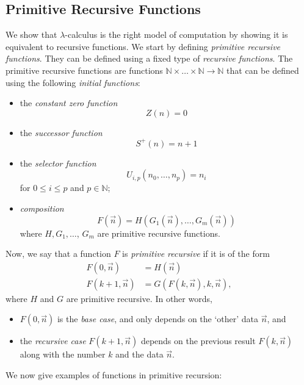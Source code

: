 \documentclass[a4paper, openany]{memoir}
\theoremstyle{definition}
\begin{document}
    \subsection{Primitive Recursive Functions}
    We show that $\lambda$-calculus is the right model of computation by showing it is equivalent to recursive functions. We start by defining \emph{primitive recursive functions}. They can be defined using a fixed type of \emph{recursive functions}. The primitive recursive functions are functions $\mathbb{N} \times \dots \times \mathbb{N} \to \mathbb{N}$ that can be defined using the following \emph{initial functions}:
    \begin{itemize}
        \item the \emph{constant zero function} 
        \[Z(n) = 0\]
        \item the \emph{successor function} 
        \[S^+(n) = n+1\]
        \item the \emph{selector function} 
        \[U_{i, p}(n_0, \dots, n_p) = n_i\]
        for $0 \leq i \leq p$ and $p \in \mathbb{N}$;
        \item \emph{composition} 
        \[F(\vec{n}) = H(G_1(\vec{n}), \dots, G_m(\vec{n}))\]
        where $H, G_1, \dots$, $G_m$ are primitive recursive functions.
    \end{itemize}
    Now, we say that a function $F$ is \emph{primitive recursive} if it is of the form
    \begin{align*}
        F(0, \vec{n}) &= H(\vec{n}) \\
        F(k+1, \vec{n}) &= G(F(k, \vec{n}), k, \vec{n}),
    \end{align*}
    where $H$ and $G$ are primitive recursive. In other words, 
    \begin{itemize}
        \item $F(0, \vec{n})$ is the \emph{base case}, and only depends on the `other' data $\vec{n}$, and
        \item the \emph{recursive case} $F(k+1, \vec{n})$ depends on the previous result $F(k, \vec{n})$ along with the number $k$ and the data $\vec{n}$.
    \end{itemize}
    We now give examples of functions in primitive recursion:
\end{document}

